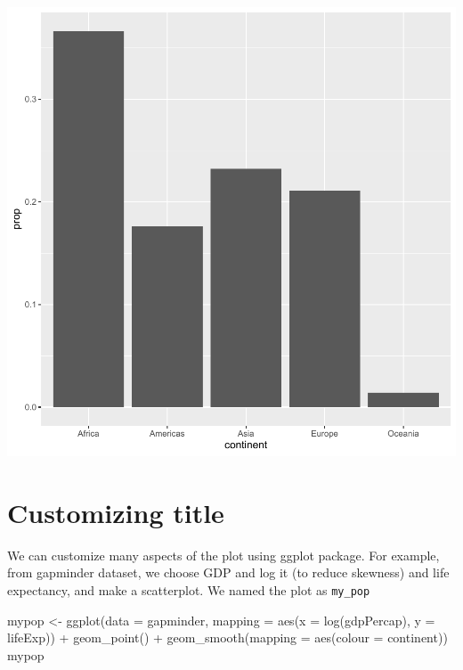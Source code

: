\documentclass[
]{book}
\makeatletter
\newenvironment{Shaded}{\begin{snugshade}}{\end{snugshade}}
\newcommand{\AttributeTok}[1]{\textcolor[rgb]{0.61,0.61,0.61}{#1}}
\newcommand{\FunctionTok}[1]{\textcolor[rgb]{0,0,0}{#1}}
\newcommand{\NormalTok}[1]{#1}
\newcommand{\OtherTok}[1]{\textcolor[rgb]{0.37,0.37,0.37}{#1}}
\newcommand{\SpecialCharTok}[1]{\textcolor[rgb]{0,0,0}{#1}}
\newenvironment{kframe}{%
\medskip{}
\setlength{\fboxsep}{.8em}
 \def\at@end@of@kframe{}%
 \ifinner\ifhmode%
  \def\at@end@of@kframe{\end{minipage}}%
  \begin{minipage}{\columnwidth}%
 \fi\fi%
 \def\FrameCommand##1{\hskip\@totalleftmargin \hskip-\fboxsep
 \colorbox{shadecolor}{##1}\hskip-\fboxsep
     \hskip-\linewidth \hskip-\@totalleftmargin \hskip\columnwidth}%
 \MakeFramed {\advance\hsize-\width
   \@totalleftmargin\z@ \linewidth\hsize
   \@setminipage}}%
 {\par\unskip\endMakeFramed%
 \at@end@of@kframe}
\renewenvironment{Shaded}{\begin{kframe}}{\end{kframe}}
\makeatother
\begin{document}
\begin{center}\includegraphics[width=0.7\linewidth,keepaspectratio]{Multivariable_Data_Analysis_files/figure-latex/unnamed-chunk-35-1} \end{center}

\hypertarget{customizing-title}{%
\section{Customizing title}\label{customizing-title}}

We can customize many aspects of the plot using ggplot package. For example, from gapminder dataset, we choose GDP and log it (to reduce skewness) and life expectancy, and make a scatterplot. We named the plot as \texttt{my\_pop}

\begin{Shaded}
\begin{Highlighting}[]
\NormalTok{mypop }\OtherTok{\textless{}{-}} \FunctionTok{ggplot}\NormalTok{(}\AttributeTok{data =}\NormalTok{ gapminder, }\AttributeTok{mapping =} \FunctionTok{aes}\NormalTok{(}\AttributeTok{x =} \FunctionTok{log}\NormalTok{(gdpPercap), }\AttributeTok{y =}\NormalTok{ lifeExp)) }\SpecialCharTok{+}
  \FunctionTok{geom\_point}\NormalTok{() }\SpecialCharTok{+}
  \FunctionTok{geom\_smooth}\NormalTok{(}\AttributeTok{mapping =} \FunctionTok{aes}\NormalTok{(}\AttributeTok{colour =}\NormalTok{ continent))}
\NormalTok{mypop}
\end{Highlighting}
\end{Shaded}
\end{document}
